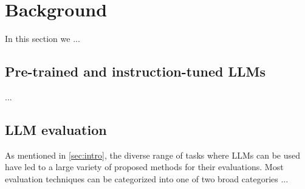 \section{Background}\label{sec:bg}

In this section we ...


\subsection{Pre-trained and instruction-tuned LLMs}

...

\subsection{LLM evaluation}

As mentioned in \cref{sec:intro}, the diverse range of tasks where LLMs can be used have led to a large variety of proposed methods for their evaluations. Most evaluation techniques can be categorized into one of two broad categories ...

